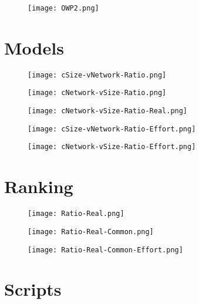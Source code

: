 \documentclass[11pt,a4paper]{report}
\begin{document}
\begin{figure}[h!]
\centering
\texttt{[image: OWP2.png]}
\end{figure}

\chapter{Models\label{app:models}}

\begin{figure}[h!]
\centering
\texttt{[image: cSize-vNetwork-Ratio.png]}
\end{figure}

\begin{figure}[h!]
\centering
\texttt{[image: cNetwork-vSize-Ratio.png]}
\end{figure}

\begin{figure}[h!]
\centering
\texttt{[image: cNetwork-vSize-Ratio-Real.png]}
\end{figure}

\begin{figure}[h!]
\centering
\texttt{[image: cSize-vNetwork-Ratio-Effort.png]}
\end{figure}

\begin{figure}[h!]
\centering
\texttt{[image: cNetwork-vSize-Ratio-Effort.png]}
\end{figure}

\chapter{Ranking\label{app:ranks}}

\begin{figure}[h!]
\centering
\texttt{[image: Ratio-Real.png]}
\end{figure}

\begin{figure}[h!]
\centering
\texttt{[image: Ratio-Real-Common.png]}
\end{figure}

\begin{figure}[h!]
\centering
\texttt{[image: Ratio-Real-Common-Effort.png]}
\end{figure}

\chapter{Scripts\label{app:script}}
\end{document}
